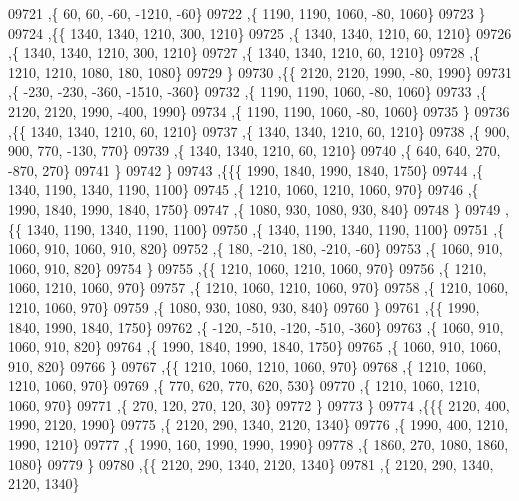 \begin{DoxyCode}
09721     ,\{    60,    60,   -60, -1210,   -60\}
09722     ,\{  1190,  1190,  1060,   -80,  1060\}
09723     \}
09724    ,\{\{  1340,  1340,  1210,   300,  1210\}
09725     ,\{  1340,  1340,  1210,    60,  1210\}
09726     ,\{  1340,  1340,  1210,   300,  1210\}
09727     ,\{  1340,  1340,  1210,    60,  1210\}
09728     ,\{  1210,  1210,  1080,   180,  1080\}
09729     \}
09730    ,\{\{  2120,  2120,  1990,   -80,  1990\}
09731     ,\{  -230,  -230,  -360, -1510,  -360\}
09732     ,\{  1190,  1190,  1060,   -80,  1060\}
09733     ,\{  2120,  2120,  1990,  -400,  1990\}
09734     ,\{  1190,  1190,  1060,   -80,  1060\}
09735     \}
09736    ,\{\{  1340,  1340,  1210,    60,  1210\}
09737     ,\{  1340,  1340,  1210,    60,  1210\}
09738     ,\{   900,   900,   770,  -130,   770\}
09739     ,\{  1340,  1340,  1210,    60,  1210\}
09740     ,\{   640,   640,   270,  -870,   270\}
09741     \}
09742    \}
09743   ,\{\{\{  1990,  1840,  1990,  1840,  1750\}
09744     ,\{  1340,  1190,  1340,  1190,  1100\}
09745     ,\{  1210,  1060,  1210,  1060,   970\}
09746     ,\{  1990,  1840,  1990,  1840,  1750\}
09747     ,\{  1080,   930,  1080,   930,   840\}
09748     \}
09749    ,\{\{  1340,  1190,  1340,  1190,  1100\}
09750     ,\{  1340,  1190,  1340,  1190,  1100\}
09751     ,\{  1060,   910,  1060,   910,   820\}
09752     ,\{   180,  -210,   180,  -210,   -60\}
09753     ,\{  1060,   910,  1060,   910,   820\}
09754     \}
09755    ,\{\{  1210,  1060,  1210,  1060,   970\}
09756     ,\{  1210,  1060,  1210,  1060,   970\}
09757     ,\{  1210,  1060,  1210,  1060,   970\}
09758     ,\{  1210,  1060,  1210,  1060,   970\}
09759     ,\{  1080,   930,  1080,   930,   840\}
09760     \}
09761    ,\{\{  1990,  1840,  1990,  1840,  1750\}
09762     ,\{  -120,  -510,  -120,  -510,  -360\}
09763     ,\{  1060,   910,  1060,   910,   820\}
09764     ,\{  1990,  1840,  1990,  1840,  1750\}
09765     ,\{  1060,   910,  1060,   910,   820\}
09766     \}
09767    ,\{\{  1210,  1060,  1210,  1060,   970\}
09768     ,\{  1210,  1060,  1210,  1060,   970\}
09769     ,\{   770,   620,   770,   620,   530\}
09770     ,\{  1210,  1060,  1210,  1060,   970\}
09771     ,\{   270,   120,   270,   120,    30\}
09772     \}
09773    \}
09774   ,\{\{\{  2120,   400,  1990,  2120,  1990\}
09775     ,\{  2120,   290,  1340,  2120,  1340\}
09776     ,\{  1990,   400,  1210,  1990,  1210\}
09777     ,\{  1990,   160,  1990,  1990,  1990\}
09778     ,\{  1860,   270,  1080,  1860,  1080\}
09779     \}
09780    ,\{\{  2120,   290,  1340,  2120,  1340\}
09781     ,\{  2120,   290,  1340,  2120,  1340\}

\end{DoxyCode}
